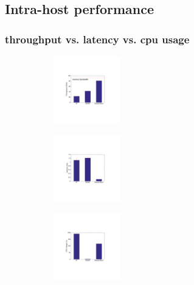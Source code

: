 \subsection{Intra-host performance}
\subsubsection{throughput vs. latency vs. cpu usage}

\begin{figure}[t]
     \centering 
     \begin{subfigure}[t]
     \centering 
     \includegraphics[width=0.32\textwidth]{figures/motivation/eval_baremetal_thr.pdf}      
     \end{subfigure}      
     \begin{subfigure}[t]
     \centering 
     \includegraphics[width=0.32\textwidth]{figures/motivation/eval_baremetal_latency.pdf}      
     \end{subfigure}      
     \begin{subfigure}[t]
     \centering 
     \includegraphics[width=0.32\textwidth]{figures/motivation/eval_baremetal_cpu.pdf}      
     \end{subfigure}           
     \label{fig:eval_baremetal_thr_latency_cpu}
     \caption{} 
\end{figure} 

